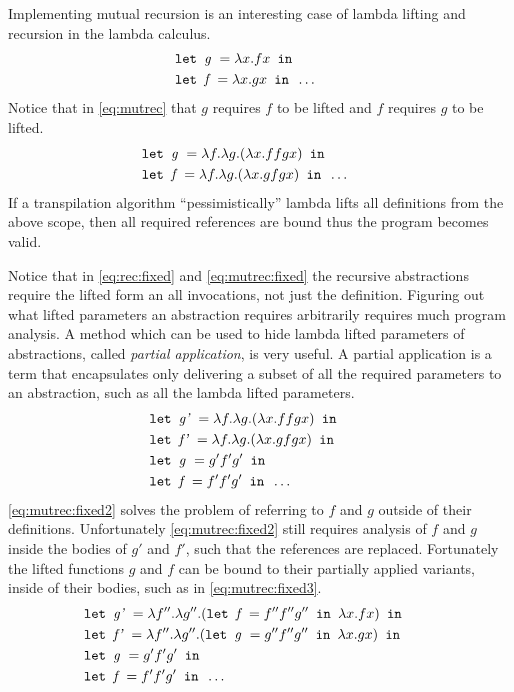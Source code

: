 Implementing mutual recursion is an interesting case of lambda lifting and recursion in the lambda calculus.
\begin{align}
  &\texttt{let } \textit{g } = \lambda x.f x \texttt{ in } \label{eq:mutrec}\\
  &\texttt{let } \textit{f } = \lambda x.g x \texttt{ in } \dots \tag*{}
\end{align}
Notice that in \autoref{eq:mutrec} that $g$ requires $f$ to be lifted and $f$ requires $g$ to be lifted.
\begin{align}
  &\texttt{let } \textit{g } = \lambda f. \lambda g.(\lambda x.f f g x) \texttt{ in } \label{eq:mutrec:fixed}\\
  &\texttt{let } \textit{f } = \lambda f. \lambda g.(\lambda x.g f g x) \texttt{ in } \dots \tag*{}
\end{align}
If a transpilation algorithm ``pessimistically'' lambda lifts all definitions from the above scope, then all required references are bound thus the program becomes valid.

Notice that in \autoref{eq:rec:fixed} and \autoref{eq:mutrec:fixed} the recursive abstractions require the lifted form an all invocations, not just the definition.
Figuring out what lifted parameters an abstraction requires arbitrarily requires much program analysis.
A method which can be used to hide lambda lifted parameters of abstractions, called \textit{partial application}, is very useful.
A partial application is a term that encapsulates only delivering a subset of all the required parameters to an abstraction, such as all the lambda lifted parameters.
\begin{align}
  &\texttt{let } \textit{g' } = \lambda f. \lambda g.(\lambda x.f f g x) \texttt{ in } \label{eq:mutrec:fixed2}\\
  &\texttt{let } \textit{f' } = \lambda f. \lambda g.(\lambda x.g f g x) \texttt{ in }  \tag*{}\\
  &\texttt{let } \textit{g } = g' f' g' \texttt{ in }  \tag*{}\\
  &\texttt{let } \textit{f } = f' f' g' \texttt{ in } \dots \tag*{}
\end{align}
\autoref{eq:mutrec:fixed2} solves the problem of referring to $f$ and $g$ outside of their definitions.
Unfortunately \autoref{eq:mutrec:fixed2} still requires analysis of $f$ and $g$ inside the bodies of $g'$ and $f'$, such that the references are replaced.
Fortunately the lifted functions $g$ and $f$  can be bound to their partially applied variants, inside of their bodies, such as in \autoref{eq:mutrec:fixed3}.
\begin{align}
  &\texttt{let } \textit{g' } = \lambda f''. \lambda g''.(\texttt{let } \textit{f } = f'' f'' g'' \texttt{ in } \lambda x.f x) \texttt{ in } \label{eq:mutrec:fixed3}\\
  &\texttt{let } \textit{f' } = \lambda f''. \lambda g''.(\texttt{let } \textit{g } = g'' f'' g'' \texttt{ in } \lambda x.g x) \texttt{ in }  \tag*{}\\
  &\texttt{let } \textit{g } = g' f' g' \texttt{ in }  \tag*{}\\
  &\texttt{let } \textit{f } = f' f' g' \texttt{ in } \dots \tag*{}
\end{align}

